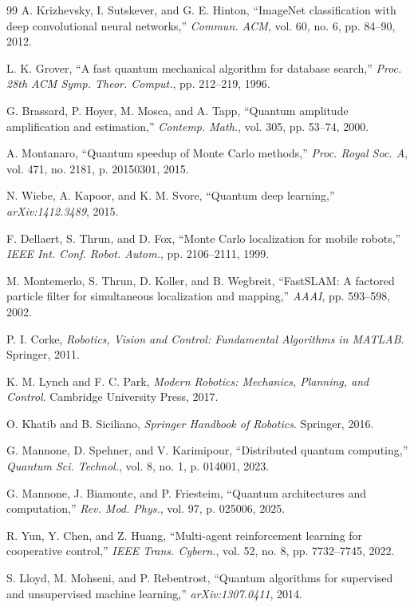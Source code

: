 \documentclass[conference]{IEEEtran}
\begin{document}
\begin{thebibliography}{99}
 A. Krizhevsky, I. Sutskever, and G. E. Hinton, ``ImageNet classification with deep convolutional neural networks,'' \textit{Commun. ACM}, vol. 60, no. 6, pp. 84--90, 2012.

 L. K. Grover, ``A fast quantum mechanical algorithm for database search,'' \textit{Proc. 28th ACM Symp. Theor. Comput.}, pp. 212--219, 1996.

 G. Brassard, P. Hoyer, M. Mosca, and A. Tapp, ``Quantum amplitude amplification and estimation,'' \textit{Contemp. Math.}, vol. 305, pp. 53--74, 2000.

 A. Montanaro, ``Quantum speedup of Monte Carlo methods,'' \textit{Proc. Royal Soc. A}, vol. 471, no. 2181, p. 20150301, 2015.

 N. Wiebe, A. Kapoor, and K. M. Svore, ``Quantum deep learning,'' \textit{arXiv:1412.3489}, 2015.

 F. Dellaert, S. Thrun, and D. Fox, ``Monte Carlo localization for mobile robots,'' \textit{IEEE Int. Conf. Robot. Autom.}, pp. 2106--2111, 1999.

 M. Montemerlo, S. Thrun, D. Koller, and B. Wegbreit, ``FastSLAM: A factored particle filter for simultaneous localization and mapping,'' \textit{AAAI}, pp. 593--598, 2002.

 P. I. Corke, \textit{Robotics, Vision and Control: Fundamental Algorithms in MATLAB}. Springer, 2011.

 K. M. Lynch and F. C. Park, \textit{Modern Robotics: Mechanics, Planning, and Control}. Cambridge University Press, 2017.

 O. Khatib and B. Siciliano, \textit{Springer Handbook of Robotics}. Springer, 2016.

 G. Mannone, D. Spehner, and V. Karimipour, ``Distributed quantum computing,'' \textit{Quantum Sci. Technol.}, vol. 8, no. 1, p. 014001, 2023.

 G. Mannone, J. Biamonte, and P. Friesteim, ``Quantum architectures and computation,'' \textit{Rev. Mod. Phys.}, vol. 97, p. 025006, 2025.

 R. Yun, Y. Chen, and Z. Huang, ``Multi-agent reinforcement learning for cooperative control,'' \textit{IEEE Trans. Cybern.}, vol. 52, no. 8, pp. 7732--7745, 2022.

 S. Lloyd, M. Mohseni, and P. Rebentrost, ``Quantum algorithms for supervised and unsupervised machine learning,'' \textit{arXiv:1307.0411}, 2014.


\end{thebibliography}
\end{document}
